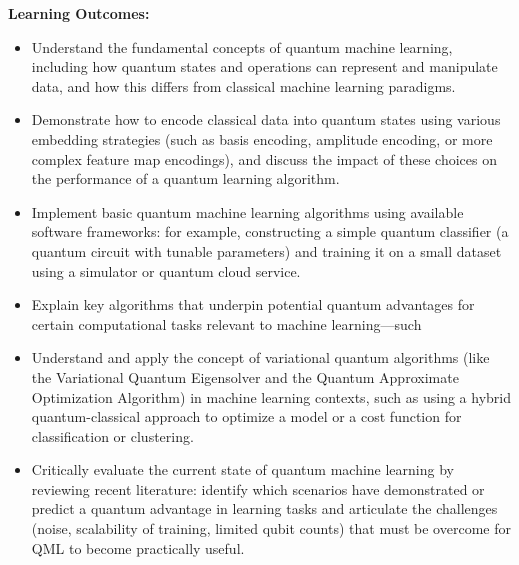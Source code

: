 \documentclass{scrreprt}
\begin{document}
\textbf{Learning Outcomes:}
\begin{itemize}
\item Understand the fundamental concepts of quantum machine learning, including how quantum states and operations can represent and manipulate data, and how this differs from classical machine learning paradigms.
\item Demonstrate how to encode classical data into quantum states using various embedding strategies (such as basis encoding, amplitude encoding, or more complex feature map encodings), and discuss the impact of these choices on the performance of a quantum learning algorithm.
\item Implement basic quantum machine learning algorithms using available software frameworks: for example, constructing a simple quantum classifier (a quantum circuit with tunable parameters) and training it on a small dataset using a simulator or quantum cloud service.
\item Explain key algorithms that underpin potential quantum advantages for certain computational tasks relevant to machine learning—such%
\item Understand and apply the concept of variational quantum algorithms (like the Variational Quantum Eigensolver and the Quantum Approximate Optimization Algorithm) in machine learning contexts, such as using a hybrid quantum-classical approach to optimize a model or a cost function for classification or clustering.
\item Critically evaluate the current state of quantum machine learning by reviewing recent literature: identify which scenarios have demonstrated or predict a quantum advantage in learning tasks and articulate the challenges (noise, scalability of training, limited qubit counts) that must be overcome for QML to become practically useful.
\end{itemize}
\end{document}
